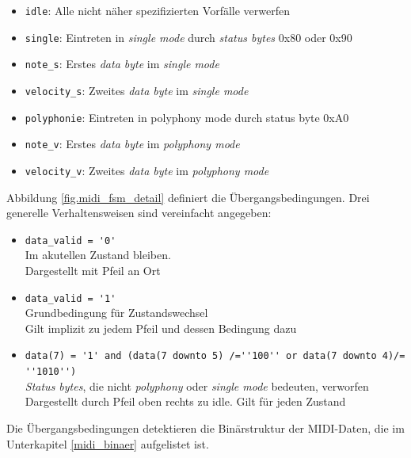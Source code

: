 \begin{itemize}
	\item \lstinline|idle|: Alle nicht näher spezifizierten Vorfälle verwerfen
	\item \lstinline|single|: Eintreten in  \textit{single mode} durch \textit{status bytes} 0x80 oder 0x90
	\item \lstinline|note_s|: Erstes \textit{data byte} im  \textit{single mode}
	\item \lstinline|velocity_s|: Zweites \textit{data byte} im \textit{single mode}
	\item \lstinline|polyphonie|: Eintreten in polyphony mode durch status byte 0xA0
	\item \lstinline|note_v|: Erstes \textit{data byte} im  \textit{polyphony mode}
	\item \lstinline|velocity_v|: Zweites \textit{data byte} im  \textit{polyphony mode}
\end{itemize}

\bigskip

Abbildung \ref{fig.midi_fsm_detail} definiert die Übergangsbedingungen. Drei generelle Verhaltensweisen sind vereinfacht angegeben:

\begin{itemize}
	\item \lstinline|data_valid = '0'|\\
        Im akutellen Zustand bleiben.\\
        Dargestellt mit Pfeil an Ort
	\item \lstinline|data_valid = '1'|\\
        Grundbedingung für Zustandswechsel\\
        Gilt implizit zu jedem Pfeil und dessen Bedingung dazu
	\item \lstinline|data(7) = '1' and (data(7 downto 5) /=''100'' or data(7 downto 4)/= ''1010'')| \\
        \textit{Status bytes}, die nicht \textit{polyphony} oder \textit{single mode} bedeuten, verworfen\\
        Dargestellt durch Pfeil oben rechts zu idle. Gilt für jeden Zustand
\end{itemize}
\bigskip

Die Übergangsbedingungen detektieren die Binärstruktur der MIDI-Daten, die im Unterkapitel \ref{midi_binaer} aufgelistet ist.


